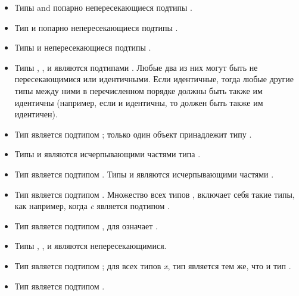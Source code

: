\begin{itemize}
\item
Типы  and  попарно непересекающиеся подтипы .
\end{itemize}

\begin{itemize}
\item
Тип  и  попарно непересекающиеся подтипы .
\end{itemize}

\begin{itemize}
\item
Типы  и  непересекающиеся подтипы .
\end{itemize}

\begin{itemize}
\item
Типы , ,  и 
 являются подтипами .  Любые два из них могут быть не
пересекающимися или идентичными. Если идентичные, тогда любые другие типы между
ними в перечисленном порядке должны быть также им идентичны (например, если  и  идентичны,
то  должен быть также им идентичен).

\item
Тип  является подтипом ; только один объект {\nil}
принадлежит типу .

\item
Типы  и  являются исчерпывающими частями типа .
\end{itemize}

\begin{itemize}
\item
Тип  является подтипом .
Типы  и 
являются исчерпывающими частями .
\end{itemize}

\begin{itemize}
\item
Тип  является подтипом .
Множество всех типов , включает себя такие типы, как
например, когда \emph{c} является подтипом .
\end{itemize}

\begin{itemize}
\item
Тип  является подтипом , для 
означает .

\item
Типы , , и  являются непересекающимися.

\item
Тип  является подтипом ; для всех типов \emph{x},
тип  является тем же, что и тип .

\item
Тип  является подтипом .
\end{itemize}

